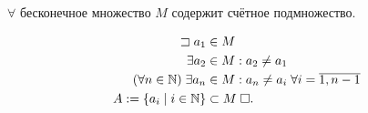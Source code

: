 \documentclass{article}
\begin{document}
\theorem

$\forall$ бесконечное множество $M$ содержит счётное подмножество.

\proof
\begin{align*}
	\sqsupset a_1                 & \in M                                           \\
	\exists a_2                   & \in M:a_2\neq a_1                               \\
	(\forall n\in\mathbb{N})\;\exists a_n & \in M: a_n \neq a_i\;\forall i=\overline{1,n-1} \\
	A:=\{a_i\;|\;i\in\mathbb{N}\}       & \subset M\;\square.                                   \\
\end{align*}
\end{document}

